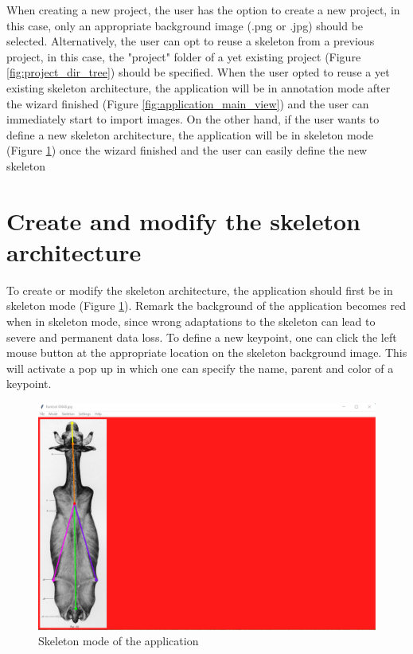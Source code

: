\documentclass[a4paper, 11pt]{article}
\begin{document}
When creating a new project, the user has the option to create a new project, in this case, only an appropriate background image (.png or .jpg) should be selected. Alternatively, the user can opt to reuse a skeleton from a previous project, in this case, the "project" folder of a yet existing project (Figure \ref{fig:project_dir_tree}) should be specified. When the user opted to reuse a yet existing skeleton architecture, the application will be in annotation mode after the wizard finished (Figure \ref{fig:application_main_view}) and the user can immediately start to import images. On the other hand, if the user wants to define a new skeleton architecture, the application will be in skeleton mode (Figure \ref{fig:application_skeleton_mode}) once the wizard finished and the user can easily define the new skeleton

\section{Create and modify the skeleton architecture}
To create or modify the skeleton architecture, the application should first be in skeleton mode (Figure \ref{fig:application_skeleton_mode}). Remark the background of the application becomes red when in skeleton mode, since wrong adaptations to the skeleton can lead to severe and permanent data loss. To define a new keypoint, one can click the left mouse button at the appropriate location on the skeleton background image. This will activate a pop up in which one can specify the name, parent and color of a keypoint.

\begin{figure}[htb]
	\centering
	\includegraphics[width=\textwidth]{application_skeleton_mode}
	\captionsetup{width=\textwidth}
	\caption{Skeleton mode of the application}
	\label{fig:application_skeleton_mode}	
\end{figure}
\end{document}
